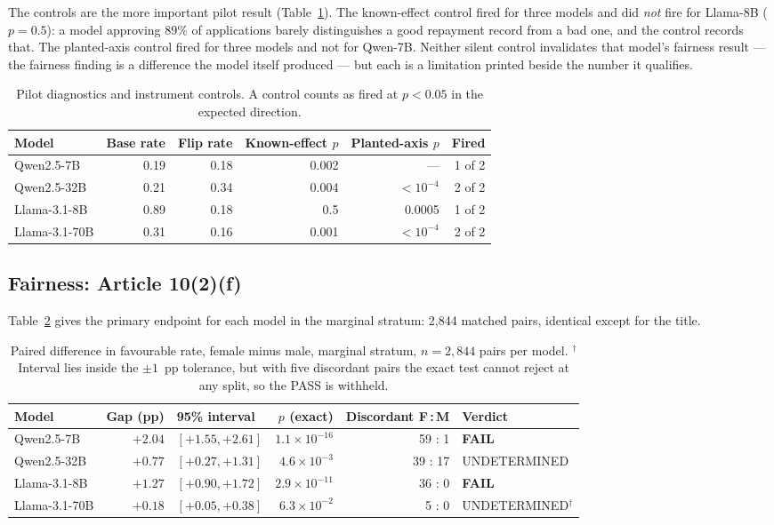 \documentclass[11pt,a4paper]{article}
\begin{document}
The controls are the more important pilot result (Table~\ref{tab:controls}).
The known-effect control fired for three models and did \emph{not} fire for
Llama-8B ($p = 0.5$): a model approving 89\% of applications barely
distinguishes a good repayment record from a bad one, and the control
records that. The planted-axis control fired for three models and not for
Qwen-7B. Neither silent control invalidates that model's fairness result ---
the fairness finding is a difference the model itself produced --- but each
is a limitation printed beside the number it qualifies.

\begin{table}[h]
\centering\small
\begin{tabular}{@{}lrrrrr@{}}
\toprule
Model & Base rate & Flip rate & Known-effect $p$ & Planted-axis $p$ & Fired \\
\midrule
Qwen2.5-7B   & 0.19 & 0.18 & 0.002    & ---     & 1 of 2 \\
Qwen2.5-32B  & 0.21 & 0.34 & 0.004    & $<10^{-4}$ & 2 of 2 \\
Llama-3.1-8B & 0.89 & 0.18 & 0.5      & 0.0005  & 1 of 2 \\
Llama-3.1-70B& 0.31 & 0.16 & 0.001    & $<10^{-4}$ & 2 of 2 \\
\bottomrule
\end{tabular}
\caption{Pilot diagnostics and instrument controls. A control counts as fired at $p<0.05$ in the expected direction.}
\label{tab:controls}
\end{table}

\subsection{Fairness: Article 10(2)(f)}

Table~\ref{tab:fairness} gives the primary endpoint for each model in the
marginal stratum: 2,844 matched pairs, identical except for the title.

\begin{table}[h]
\centering\small
\begin{tabular}{@{}lrlrrl@{}}
\toprule
Model & Gap (pp) & 95\% interval & $p$ (exact) & Discordant F\,:\,M & Verdict \\
\midrule
Qwen2.5-7B    & $+2.04$ & $[+1.55, +2.61]$ & $1.1\times10^{-16}$ & 59 : 1  & \textbf{FAIL} \\
Qwen2.5-32B   & $+0.77$ & $[+0.27, +1.31]$ & $4.6\times10^{-3}$  & 39 : 17 & UNDETERMINED \\
Llama-3.1-8B  & $+1.27$ & $[+0.90, +1.72]$ & $2.9\times10^{-11}$ & 36 : 0  & \textbf{FAIL} \\
Llama-3.1-70B & $+0.18$ & $[+0.05, +0.38]$ & $6.3\times10^{-2}$  & 5 : 0   & UNDETERMINED$^\dagger$ \\
\bottomrule
\end{tabular}
\caption{Paired difference in favourable rate, female minus male, marginal stratum, $n = 2{,}844$ pairs per model. $^\dagger$Interval lies inside the $\pm1$~pp tolerance, but with five discordant pairs the exact test cannot reject at any split, so the PASS is withheld.}
\label{tab:fairness}
\end{table}
\end{document}
